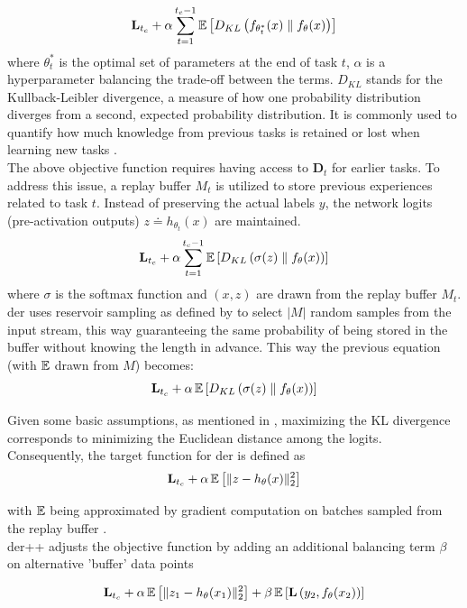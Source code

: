 \[
\mathbf{L}_{t_{c}} + \alpha \sum_{t=1}^{t_{c}-1} \operatorname{\mathbb{E}} \left[ D_{KL} \left( f_{\theta_{t}^{*}}(x) \parallel f_{\theta}(x) \right) \right]
\]
where $\theta_{t}^{*}$ is the optimal set of parameters at the end of task $t$, $\alpha$ is a hyperparameter balancing the trade-off between the terms. 
$D_{KL}$ stands for the Kullback-Leibler divergence, a measure of how one probability distribution diverges from a second, expected probability distribution. It is commonly used to quantify how much knowledge from previous tasks is retained or lost when learning new tasks \citep{goodfellow2016deep}.\\
The above objective function requires having access to $\mathbf{D}_{t}$ for earlier tasks. To address this issue, a replay buffer $M_{t}$ is utilized to store previous experiences related to task $t$. Instead of preserving the actual labels $y$, the network logits (pre-activation outputs) $z \doteq h_{\theta_{t}}(x)$ are maintained. 
\[
\mathbf{L}_{t_{c}} + \alpha \sum_{t=1}^{t_{c}-1} \operatorname{\mathbb{E}} \left[ D_{KL} \left( \sigma(z) \parallel f_{\theta}(x) \right) \right]
\]
where $\sigma$ is the softmax function and $(x,z)$ are drawn from the replay buffer $M_{t}$. \\
\acrshort{der} uses reservoir sampling as defined by \citep{vitter1985random} to select $|M|$ random samples from the input stream, this way guaranteeing the same probability of being stored in the buffer without knowing the length in advance. This way the previous equation (with $\operatorname{\mathbb{E}}$ drawn from $M$) becomes:
\[
\mathbf{L}_{t_{c}} + \alpha \operatorname{\mathbb{E}} \left[ D_{KL} \left( \sigma(z) \parallel f_{\theta}(x) \right) \right]
\]

Given some basic assumptions, as mentioned in \citep{hinton2015distilling}, maximizing the KL divergence corresponds to minimizing the Euclidean distance among the logits. Consequently, the target function for \acrshort{der} is defined as
\[
\mathbf{L}_{t_{c}} + \alpha \operatorname{\mathbb{E}} \left[ \| z - h_{\theta}(x) \|^{2}_{2} \right]
\]

with $\operatorname{\mathbb{E}}$ being approximated by gradient computation on batches sampled from the replay buffer \citep{buzzega2020dark, boschini2022class}. \\
\acrshort{der++} adjusts the objective function by adding an additional balancing term $\beta$ on alternative 'buffer' data points

\[
\mathbf{L}_{t_{c}} + \alpha \operatorname{\mathbb{E}} \left[ \| z_{1} - h_{\theta}(x_{1}) \|^{2}_{2} \right] + \beta \operatorname{\mathbb{E}} \left[ \mathbf{L} \left( y_{2}, f_{\theta}(x_{2}) \right) \right]
\]

